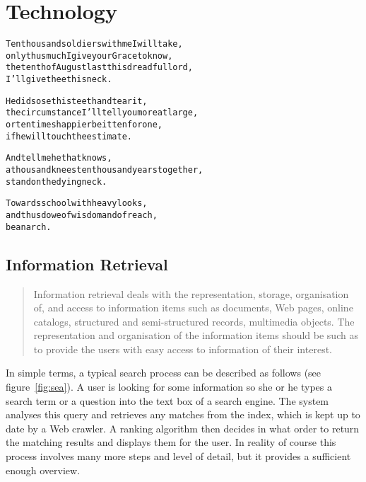 
\chapter{Technology}
\label{ch:technology}

\startcontents[chapters]

\vfill

\begin{alltt}\sffamily
Ten thousand soldiers with me I will take,
only thus much I give your Grace to know,
the tenth of August last this dreadful lord,
I'll give thee this neck.

He did so set his teeth and tear it,
the circumstance I'll tell you more at large,
or ten times happier be it ten for one,
if he will touch the estimate.

And tell me he that knows,
a thousand knees ten thousand years together,
stand on the dying neck.

Towards school with heavy looks,
and thus do we of wisdom and of reach,
be an arch.
\end{alltt}

\newpage
\minicontents
\spirals


\section{Information Retrieval}

\begin{quotation}
  Information retrieval deals with the representation, storage, organisation of, and access to information items such as documents, Web pages, online catalogs, structured and semi-structured records, multimedia objects. The representation and organisation of the information items should be such as to provide the users with easy access to information of their interest. 
\end{quotation}

In simple terms, a typical search process can be described as follows (see figure~\ref{fig:sea}). A user is looking for some information so she or he types a search term or a question into the text box of a search engine. The system analyses this query and retrieves any matches from the index, which is kept up to date by a Web crawler. A ranking algorithm then decides in what order to return the matching results and displays them for the user. In reality of course this process involves many more steps and level of detail, but it provides a sufficient enough overview.

